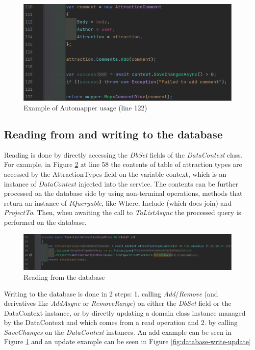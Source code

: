 \begin{figure}[!ht]
    \centering
    \includegraphics[width=1\linewidth]{4.3.2_automapper-usage.png}
    \caption{Example of Automapper usage (line 122)}
    \label{fig:automapper-usage}
\end{figure}


\subsection{Reading from and writing to the database}

\par Reading is done by directly accessing the \textit{DbSet} fields of the \textit{DataContext} class. For example, in Figure \ref{fig:database-read} at line 58 the contents of table of attraction types are accessed by the AttractionTypes field on the variable context, which is an instance of \textit{DataContext} injected into the service. The contents can be further processed on the database side by using non-terminal operations, methods that return an instance of \textit{IQueryable}, like Where, Include (which does join) and \textit{ProjectTo}. Then, when awaiting the call to \textit{ToListAsync} the processed query is performed on the database.

\begin{figure}[!ht]
    \centering
    \includegraphics[width=1\linewidth]{4.3.3_database-read.png}
    \caption{Reading from the database}
    \label{fig:database-read}
\end{figure}

\par Writing to the database is done in 2 steps: 1. calling \textit{Add}/\textit{Remove} (and derivatives like \textit{AddAsync} or \textit{RemoveRange}) on either the \textit{DbSet} field or the DataContext instance, or by directly updating a domain class instance managed by the DataContext and which comes from a read operation and 2. by calling \textit{SaveChanges} on the \textit{DataContext} instances. An add example can be seen in Figure \ref{fig:automapper-usage} and an update example can be seen in Figure \ref{fig:database-write-update}

